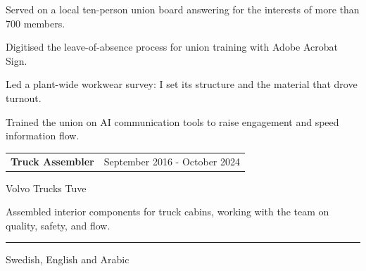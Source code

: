 \documentclass[11pt,a4paper]{article}
\makeatletter
\newcommand{\body}[1]{{\fontsize{11}{14.4}\selectfont #1}\par}
\newcommand{\detail}[1]{{\fontsize{10.5}{13.5}\selectfont\color{inkmeta} #1}}
\newcommand{\entrygap}{\vspace{0.40cm}}
\newenvironment{cvbullets}{%
  \begin{list}{{\fontsize{8}{8}\selectfont\color{inkmeta}\raisebox{0.55pt}{\textbullet}}}{%
    \setlength{\labelwidth}{0.55em}%
    \setlength{\labelsep}{0.45em}%
    \setlength{\leftmargin}{1.00em}%
    \setlength{\rightmargin}{0pt}%
    \setlength{\itemindent}{0pt}%
    \setlength{\listparindent}{0pt}%
    \setlength{\topsep}{0.10cm}%
    \setlength{\partopsep}{0pt}%
    \setlength{\parsep}{0pt}%
    \setlength{\itemsep}{0.07cm}%
    \fontsize{11}{14.4}\selectfont
  }%
}{%
  \end{list}%
}
\newcommand{\cvsection}[1]{%
  \par\vspace{0.62cm}%
  {\fontsize{11.5}{13}\selectfont\bfseries\color{accentteal}%
    \textls[60]{\MakeUppercase{#1}}}%
  \par\nointerlineskip\vspace{0.13cm}%
  {\color{rulegrey}\rule{\textwidth}{0.5pt}}%
  \par\nointerlineskip\vspace{0.28cm}%
}
\newcommand{\cventry}[3]{%
  \noindent\begin{tabular*}{\textwidth}{@{\extracolsep{\fill}}lr@{}}
    {\fontsize{12.5}{15}\selectfont\bfseries #1} & \detail{#3}
  \end{tabular*}%
  \par\vspace{0.06cm}%
  \detail{#2}%
  \par\vspace{0.14cm}%
}
\makeatother
\begin{document}
\begin{cvbullets}
\item Served on a local ten-person union board answering for the interests of more than 700 members.
\item Digitised the leave-of-absence process for union training with Adobe Acrobat Sign.
\item Led a plant-wide workwear survey: I set its structure and the material that drove turnout.
\item Trained the union on AI communication tools to raise engagement and speed information flow.
\end{cvbullets}

\entrygap

\cventry{Truck Assembler}{Volvo Trucks Tuve}{September 2016 - October 2024}

\body{Assembled interior components for truck cabins, working with the team on quality, safety, and flow.}

\cvsection{Languages}

\body{Swedish, English and Arabic}
\end{document}
